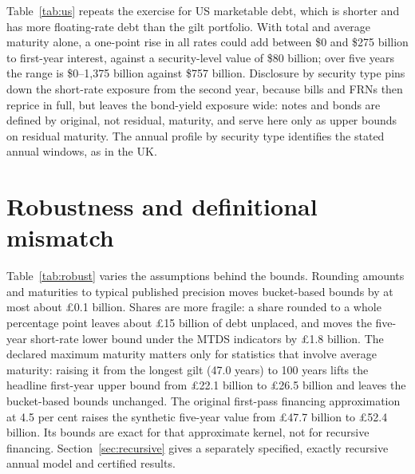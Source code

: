 \documentclass[11pt,a4paper]{article}
\theoremstyle{remark}
\begin{document}
Table~\ref{tab:us} repeats the exercise for US marketable debt, which is shorter and has more floating-rate debt than the gilt portfolio. With total and average maturity alone, a one-point rise in all rates could add between \$0 and \$275 billion to first-year interest, against a security-level value of \$80 billion; over five years the range is \$0--1,375 billion against \$757 billion. Disclosure by security type pins down the short-rate exposure from the second year, because bills and FRNs then reprice in full, but leaves the bond-yield exposure wide: notes and bonds are defined by original, not residual, maturity, and serve here only as upper bounds on residual maturity. The annual profile by security type identifies the stated annual windows, as in the UK.

\begin{table}[t]\centering\small
\caption{Identified intervals for the increase in US debt interest, \$ billion (gross marketable debt; years from 1 October 2026).}\label{tab:us}
\resizebox{\textwidth}{!}{}
\end{table}

\section{Robustness and definitional mismatch}\label{sec:robust}

Table~\ref{tab:robust} varies the assumptions behind the bounds. Rounding amounts and maturities to typical published precision moves bucket-based bounds by at most about £0.1 billion. Shares are more fragile: a share rounded to a whole percentage point leaves about £15 billion of debt unplaced, and moves the five-year short-rate lower bound under the MTDS indicators by £1.8 billion. The declared maximum maturity matters only for statistics that involve average maturity: raising it from the longest gilt (47.0 years) to 100 years lifts the headline first-year upper bound from £22.1 billion to £26.5 billion and leaves the bucket-based bounds unchanged. The original first-pass financing approximation at 4.5 per cent raises the synthetic five-year value from £47.7 billion to £52.4 billion. Its bounds are exact for that approximate kernel, not for recursive financing. Section~\ref{sec:recursive} gives a separately specified, exactly recursive annual model and certified results.
\end{document}
